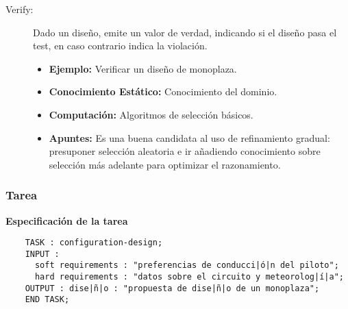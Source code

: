 \documentclass[12pt,a4paper,twoside,spanish]{article}      %
\begin{document}
\begin{description}
\begin{itemize}
        \end{itemize}
    \item [Verify:] Dado un diseño, emite un valor de verdad, indicando si el diseño pasa el test, en caso contrario indica la violación.
        \begin{itemize}
            \item \textbf {Ejemplo:} Verificar un diseño de monoplaza.
            \item \textbf {Conocimiento Estático:} Conocimiento del dominio.
            \item \textbf {Computación:}  Algoritmos de selección básicos.
            \item \textbf {Apuntes:} Es una buena candidata al uso de refinamiento gradual: presuponer selección aleatoria e ir añadiendo conocimiento sobre selección más adelante para optimizar el razonamiento.
        \end{itemize}
\end{description}

\newpage
\subsubsection{Tarea}
\textbf {Especificación de la tarea}
\begin{lstlisting}
    TASK : configuration-design;
    INPUT :
      soft requirements : "preferencias de conducci|ó|n del piloto";
      hard requirements : "datos sobre el circuito y meteorolog|í|a";
    OUTPUT : dise|ñ|o : "propuesta de dise|ñ|o de un monoplaza";
    END TASK;
\end{lstlisting}
\end{document}
